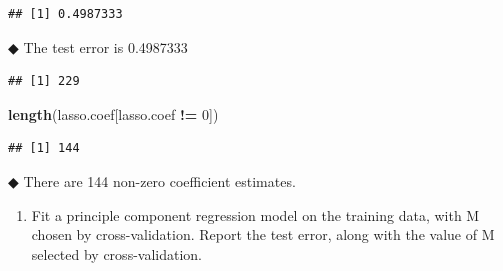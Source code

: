 \documentclass[]{article}
\newenvironment{Shaded}{\begin{snugshade}}{\end{snugshade}}
\newcommand{\DataTypeTok}[1]{\textcolor[rgb]{0.13,0.29,0.53}{#1}}
\newcommand{\DecValTok}[1]{\textcolor[rgb]{0.00,0.00,0.81}{#1}}
\newcommand{\KeywordTok}[1]{\textcolor[rgb]{0.13,0.29,0.53}{\textbf{#1}}}
\newcommand{\NormalTok}[1]{#1}
\newcommand{\OperatorTok}[1]{\textcolor[rgb]{0.81,0.36,0.00}{\textbf{#1}}}
\newcommand{\OtherTok}[1]{\textcolor[rgb]{0.56,0.35,0.01}{#1}}
\newcommand{\StringTok}[1]{\textcolor[rgb]{0.31,0.60,0.02}{#1}}
\providecommand{\tightlist}{%
  \setlength{\itemsep}{0pt}\setlength{\parskip}{0pt}}
\begin{document}
\begin{verbatim}
## [1] 0.4987333
\end{verbatim}

◆ The test error is 0.4987333

\begin{Shaded}
\end{Shaded}

\begin{verbatim}
## [1] 229
\end{verbatim}

\begin{Shaded}
\begin{Highlighting}[]
\KeywordTok{length}\NormalTok{(lasso.coef[lasso.coef }\OperatorTok{!=}\StringTok{ }\DecValTok{0}\NormalTok{])}
\end{Highlighting}
\end{Shaded}

\begin{verbatim}
## [1] 144
\end{verbatim}

◆ There are 144 non-zero coefficient estimates.

\begin{enumerate}
\def\labelenumi{\alph{enumi})}
\setcounter{enumi}{3}
\tightlist
\item
  Fit a principle component regression model on the training data, with
  M chosen by cross-validation. Report the test error, along with the
  value of M selected by cross-validation.
\end{enumerate}

\begin{Shaded}
\end{Shaded}
\end{document}
